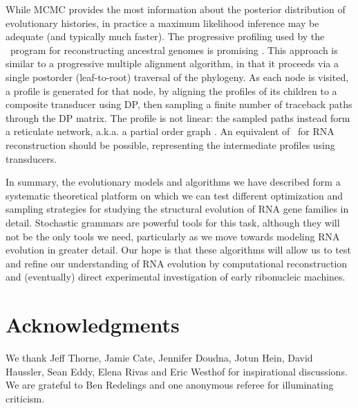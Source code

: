 \documentclass[10pt]{article}
\begin{document}
While MCMC provides the most information about the posterior distribution of evolutionary histories,
in practice a maximum likelihood inference may be adequate (and typically much faster).
The progressive profiling used by the \ortheus\ program for
reconstructing ancestral genomes is promising \cite{PatenHolmesBirney2008}.
This approach is similar to a progressive multiple alignment algorithm, in that it proceeds via a single postorder (leaf-to-root) traversal of the phylogeny.
As each node is visited, a profile is generated for that node, by aligning the profiles of its children to a composite transducer using DP, then sampling a finite number of traceback paths through the DP matrix.
The profile is not linear: the sampled paths instead form a reticulate network, a.k.a. a partial order graph \cite{LeeGrassoSharlow2002}.
An equivalent of \ortheus\ for RNA reconstruction should be possible,
representing the intermediate profiles using transducers.

In summary, the evolutionary models and algorithms we have described form a
systematic theoretical platform on which we can test different optimization and sampling strategies
for studying the structural evolution of RNA gene families in detail.
Stochastic grammars are powerful tools for this task, although they will not be the only tools we need,
particularly as we move towards modeling RNA evolution in greater detail.
Our hope is that these algorithms will allow us to test and refine our
understanding of RNA evolution by computational reconstruction and (eventually)
direct experimental investigation of early ribonucleic machines.











\newpage
\section*{Acknowledgments}

We thank
Jeff Thorne,
Jamie Cate,
Jennifer Doudna,
Jotun Hein,
David Haussler,
Sean Eddy,
Elena Rivas and
Eric Westhof
for inspirational discussions.
We are grateful to Ben Redelings and one anonymous referee for illuminating criticism.
\end{document}

